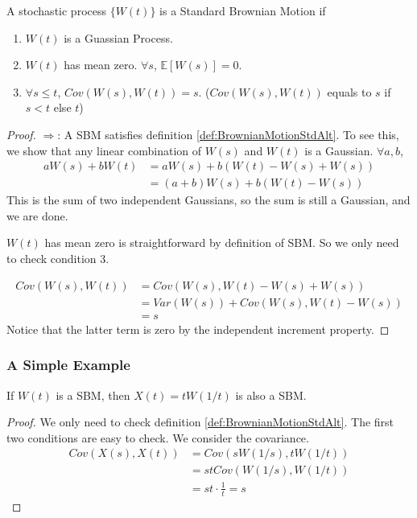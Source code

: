         \begin{definition}\label{def:BrownianMotionStdAlt}
            A stochastic process $\{W(t)\}$ is a Standard Brownian Motion if
            \begin{enumerate}
                \item $W(t)$ is a Guassian Process.
                \item $W(t)$ has mean zero. $\forall s$, $\mathbb{E}[W(s)] = 0$.
                \item $\forall s \le t$, $Cov(W(s), W(t)) = s$. ($Cov(W(s), W(t))$ equals to $s$ if $s < t$ else $t$)
            \end{enumerate}
        \end{definition}
        \begin{proof}
            $\Rightarrow$: A SBM satisfies definition \ref{def:BrownianMotionStdAlt}. To see this, we show that any linear combination of $W(s)$ and $W(t)$ is a Gaussian. $\forall a,b$,
            \begin{align*}
                aW(s) + bW(t) &= aW(s) + b(W(t) - W(s) + W(s))\\
                &= (a+b)W(s) + b(W(t)-W(s))
            \end{align*}
            This is the sum of two independent Gaussians, so the sum is still a Gaussian, and we are done.

            $W(t)$ has mean zero is straightforward by definition of SBM. So we only need to check condition 3.

            \begin{align*}
                Cov(W(s), W(t)) &= Cov(W(s), W(t) - W(s) + W(s))\\
                &= Var(W(s)) + Cov(W(s), W(t) - W(s))\\
                &=s
            \end{align*}
            Notice that the latter term is zero by the independent increment property.
        \end{proof}

        \subsubsection{A Simple Example}
            If $W(t)$ is a SBM, then $X(t)=tW(1/t)$ is also a SBM.
            \begin{proof}
                We only need to check definition \ref{def:BrownianMotionStdAlt}. The first two conditions are easy to check. We consider the covariance.
                \begin{align*}
                    Cov(X(s), X(t)) &= Cov(sW(1/s),tW(1/t))\\
                    &= stCov(W(1/s), W(1/t))\\
                    &= st\cdot\frac{1}{t} = s
                \end{align*}
            \end{proof}

